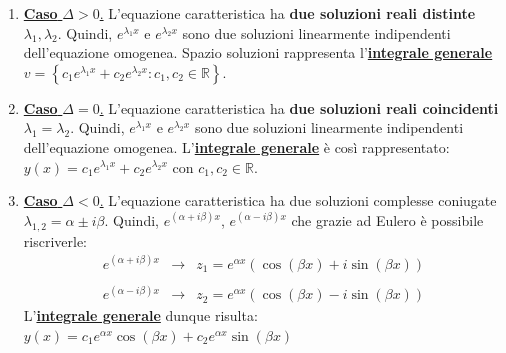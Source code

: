 \documentclass[a4paper]{article}
\begin{document}
	\begin{enumerate}[label=\Roman*.]
		\item \textcolor{Red3}{\underline{\textbf{Caso} $\Delta > 0$.}} L'equazione caratteristica ha \textbf{due soluzioni reali distinte} $\lambda_{1}, \lambda_{2}$.\newline
		Quindi, $e^{\lambda_{1}x}$ e $e^{\lambda_{2}x}$ sono due soluzioni linearmente indipendenti dell'equazione omogenea.\newline
		Spazio soluzioni rappresenta l'\textbf{\underline{integrale generale}} $v = \left\{c_{1}e^{\lambda_{1}x} + c_{2}e^{\lambda_{2}x} : c_{1}, c_{2} \in \mathbb{R}\right\}$.
		
		\item \textcolor{Red3}{\underline{\textbf{Caso} $\Delta = 0$.}} L'equazione caratteristica ha \textbf{due soluzioni reali coincidenti} $\lambda_{1} = \lambda_{2}$.\newline
		Quindi, $e^{\lambda_{1}x}$ e $e^{\lambda_{2}x}$ sono due soluzioni linearmente indipendenti dell'equazione omogenea.\newline
		L'\textbf{\underline{integrale generale}} è così rappresentato: $y\left(x\right) = c_{1}e^{\lambda_{1}x} + c_{2}e^{\lambda_{2}x}$ con $c_{1}, c_{2} \in \mathbb{R}$.
		
		\item \textcolor{Red3}{\underline{\textbf{Caso} $\Delta < 0$.}} L'equazione caratteristica ha due soluzioni complesse coniugate $\lambda_{1,2} = \alpha \pm i\beta$.\newline
		Quindi, $e^{\left(\alpha + i\beta\right)x}$, $e^{\left(\alpha - i\beta\right)x}$ che grazie ad Eulero è possibile riscriverle:
		\begin{equation*}
			\begin{array}{lll}
				e^{\left(\alpha + i\beta\right)x}	& \longrightarrow & z_{1} = e^{\alpha x}\left(\cos\left(\beta x\right) + i \sin\left(\beta x\right)\right) \\
				&& \\
				e^{\left(\alpha - i\beta\right)x}   & \longrightarrow & z_{2} = e^{\alpha x}\left(\cos\left(\beta x\right) - i \sin\left(\beta x\right)\right)
			\end{array}
		\end{equation*}
		L'\textbf{\underline{integrale generale}} dunque risulta: $y\left(x\right) = c_{1}e^{\alpha x}\cos\left(\beta x\right) + c_{2}e^{\alpha x}\sin\left(\beta x\right)$
	\end{enumerate}
\end{document}
